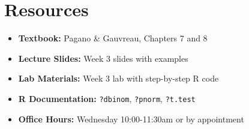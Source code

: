 \documentclass[11pt]{article}
\begin{document}
\section*{Resources}

\begin{itemize}
\item \textbf{Textbook:} Pagano \& Gauvreau, Chapters 7 and 8
\item \textbf{Lecture Slides:} Week 3 slides with examples
\item \textbf{Lab Materials:} Week 3 lab with step-by-step R code
\item \textbf{R Documentation:} \texttt{?dbinom}, \texttt{?pnorm}, \texttt{?t.test}
\item \textbf{Office Hours:} Wednesday 10:00-11:30am or by appointment
\end{itemize}
\end{document}
